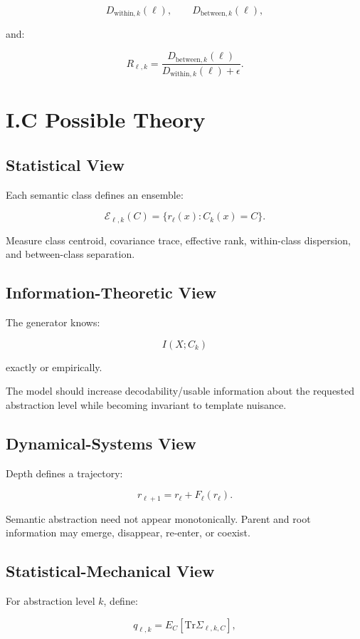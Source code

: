 \documentclass[10pt]{article}
\begin{document}
\[
D_{\mathrm{within},k}(\ell),
\qquad
D_{\mathrm{between},k}(\ell),
\]

and:

\[
R_{\ell,k}
=
\frac{D_{\mathrm{between},k}(\ell)}
{D_{\mathrm{within},k}(\ell)+\epsilon}.
\]

\section{I.C Possible Theory}

\subsection{Statistical View}

Each semantic class defines an ensemble:

\[
\mathcal E_{\ell,k}(C)
=
\{r_\ell(x):C_k(x)=C\}.
\]

Measure class centroid, covariance trace, effective rank, within-class dispersion, and between-class separation.

\subsection{Information-Theoretic View}

The generator knows:

\[
I(X;C_k)
\]

exactly or empirically.

The model should increase decodability/usable information about the requested abstraction level while becoming invariant to template nuisance.

\subsection{Dynamical-Systems View}

Depth defines a trajectory:

\[
r_{\ell+1}=r_\ell+F_\ell(r_\ell).
\]

Semantic abstraction need not appear monotonically. Parent and root information may emerge, disappear, re-enter, or coexist.

\subsection{Statistical-Mechanical View}

For abstraction level \(k\), define:

\[
q_{\ell,k}
=
E_C[\mathrm{Tr}\Sigma_{\ell,k,C}],
\]
\end{document}
